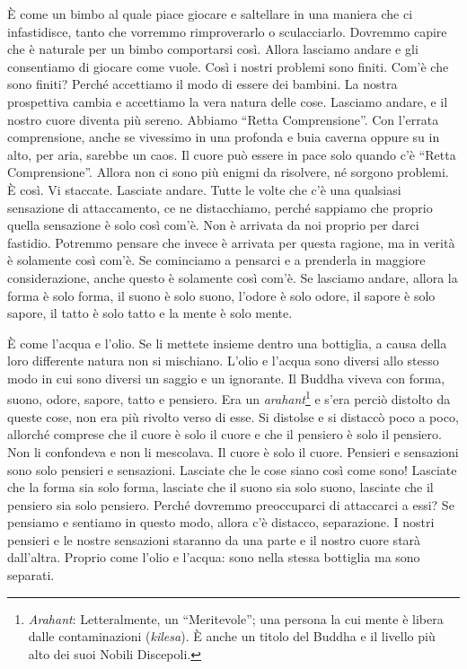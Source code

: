 È come un bimbo al quale piace giocare e saltellare in una maniera che
ci infastidisce, tanto che vorremmo rimproverarlo o sculacciarlo.
Dovremmo capire che è naturale per un bimbo comportarsi così. Allora
lasciamo andare e gli consentiamo di giocare come vuole. Così i nostri
problemi sono finiti. Com'è che sono finiti? Perché accettiamo il modo
di essere dei bambini. La nostra prospettiva cambia e accettiamo la vera
natura delle cose. Lasciamo andare, e il nostro cuore diventa più
sereno. Abbiamo ``Retta Comprensione''. Con l'errata comprensione, anche
se vivessimo in una profonda e buia caverna oppure su in alto, per aria,
sarebbe un caos. Il cuore può essere in pace solo quando c'è ``Retta
Comprensione''. Allora non ci sono più enigmi da risolvere, né sorgono
problemi. È così. Vi staccate. Lasciate andare. Tutte le volte che c'è
una qualsiasi sensazione di attaccamento, ce ne distacchiamo, perché
sappiamo che proprio quella sensazione è solo così com'è. Non è arrivata
da noi proprio per darci fastidio. Potremmo pensare che invece è
arrivata per questa ragione, ma in verità è solamente così com'è. Se
cominciamo a pensarci e a prenderla in maggiore considerazione, anche
questo è solamente così com'è. Se lasciamo andare, allora la forma è
solo forma, il suono è solo suono, l'odore è solo odore, il sapore è
solo sapore, il tatto è solo tatto e la mente è solo mente.

È come l'acqua e l'olio. Se li mettete insieme dentro una bottiglia, a
causa della loro differente natura non si mischiano. L'olio e l'acqua
sono diversi allo stesso modo in cui sono diversi un saggio e un
ignorante. Il Buddha viveva con forma, suono, odore, sapore, tatto e
pensiero. Era un \emph{arahant}\footnote{\emph{Arahant}: Letteralmente,
  un ``Meritevole''; una persona la cui mente è libera dalle
  contaminazioni (\emph{kilesa}). È anche un titolo del Buddha e il
  livello più alto dei suoi Nobili Discepoli.} e s'era perciò distolto
da queste cose, non era più rivolto verso di esse. Si distolse e si
distaccò poco a poco, allorché comprese che il cuore è solo il cuore e
che il pensiero è solo il pensiero. Non li confondeva e non li
mescolava. Il cuore è solo il cuore. Pensieri e sensazioni sono solo
pensieri e sensazioni. Lasciate che le cose siano così come sono!
Lasciate che la forma sia solo forma, lasciate che il suono sia solo
suono, lasciate che il pensiero sia solo pensiero. Perché dovremmo
preoccuparci di attaccarci a essi? Se pensiamo e sentiamo in questo
modo, allora c'è distacco, separazione. I nostri pensieri e le nostre
sensazioni staranno da una parte e il nostro cuore starà dall'altra.
Proprio come l'olio e l'acqua: sono nella stessa bottiglia ma sono
separati.

